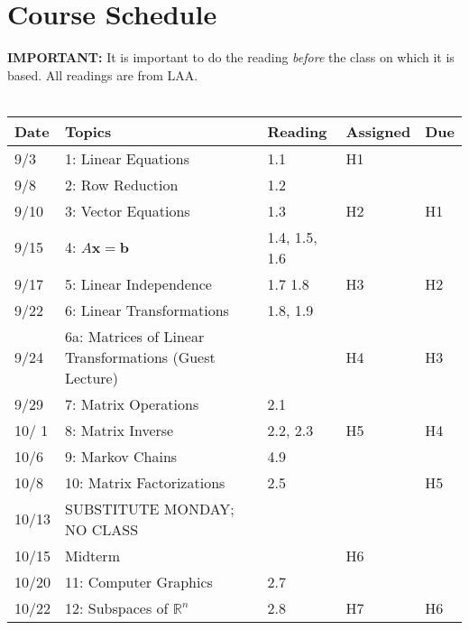 \documentclass[11pt]{article}
\begin{document}
\newpage
\section*{Course Schedule}

\textbf{IMPORTANT:} It is important to do the reading \emph{before} the class on
which it is based.   All readings are from LAA.
\\~\\
\small
\begin{centering}
\begin{tabular}{||l|p{3in}|l|l|l||}
\hline\hline
Date & Topics  & Reading & Assigned & Due  \\
\hline\hline
9/3 & 1: Linear Equations & 1.1 & H1  & \\
\hline

9/8 &  2: Row Reduction & 1.2  &  & \\
9/10 & 3: Vector Equations & 1.3 & H2 & H1 \\
\hline

9/15 & 4: $A\mathbf{x} =\mathbf{b}$  & 1.4, 1.5, 1.6 &  & \\
9/17 & 5: Linear Independence & 1.7 1.8 & H3 & H2 \\ %
\hline

9/22 & 6: Linear Transformations  & 1.8, 1.9 & & \\
9/24 & 6a: Matrices of Linear Transformations (Guest Lecture)&  & H4 & H3\\ 
\hline

9/29 & 7: Matrix Operations  & 2.1 & & \\  
10/ 1 &8: Matrix Inverse & 2.2, 2.3 & H5 & H4 \\ 
\hline

10/6 & 9: Markov Chains & 4.9 & &  \\   
10/8 &10: Matrix Factorizations & 2.5 & & H5 \\ %
\hline

% 
10/13 & SUBSTITUTE MONDAY; NO CLASS &&&\\
10/15 & Midterm & & H6 &\\
\hline

10/20 & 11: Computer Graphics & 2.7 & &\\ 
10/22 & 12: Subspaces of $\mathbb{R}^n$ & 2.8 & H7& H6\\ 
\hline


\end{tabular}
\end{centering}
\end{document}
